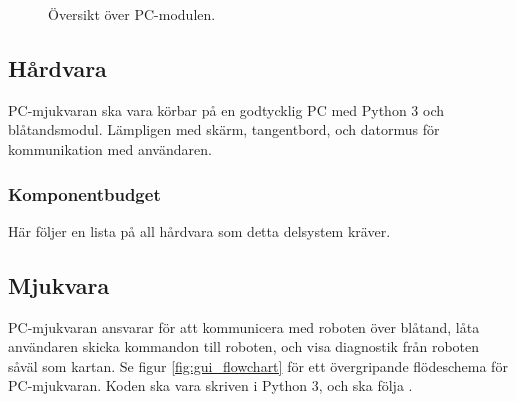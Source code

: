 \documentclass[a4paper,11pt]{article}
\begin{document}
\begin{figure}[h!]
    \caption{Översikt över PC-modulen.}
    \label{fig:unitPC}
\end{figure}
\subsection{Hårdvara}
PC-mjukvaran ska vara körbar på en godtycklig PC med Python 3 och blåtandsmodul. Lämpligen med skärm, tangentbord, och datormus för kommunikation med användaren.

\subsubsection{Komponentbudget}
Här följer en lista på all hårdvara som detta delsystem kräver.

\begin{center}
\begin{HardwareList}
\end{HardwareList}
\end{center}

\subsection{Mjukvara}
PC-mjukvaran ansvarar för att kommunicera med roboten över blåtand, låta användaren skicka kommandon till roboten, och visa diagnostik från roboten såväl som kartan. Se figur \ref{fig:gui_flowchart} för ett övergripande flödeschema för PC-mjukvaran. Koden ska vara skriven i Python 3, och ska följa \cite{pep8}.
\end{document}
